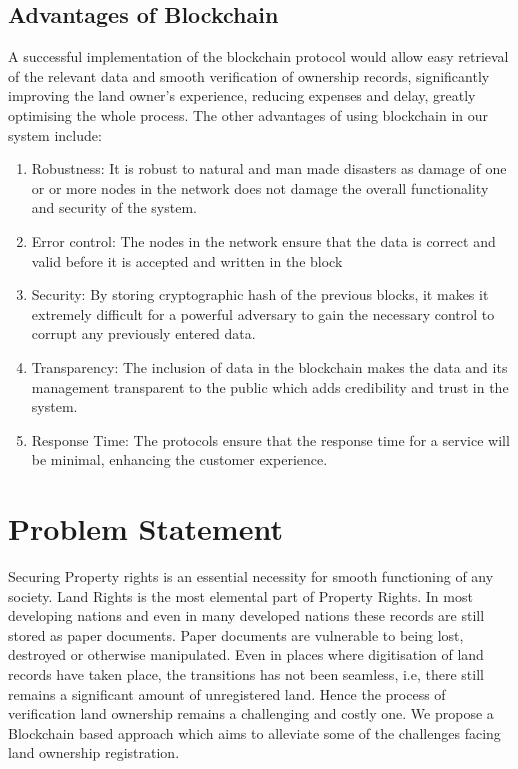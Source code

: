 \documentclass[conference]{IEEEtran}
\begin{document}
\subsection{Advantages of Blockchain}
A successful implementation of the blockchain protocol would allow easy retrieval of the relevant data and smooth verification of ownership records, significantly improving the land owner's experience, reducing expenses and delay, greatly optimising the whole process. The other advantages of using blockchain in our system include:
\begin{enumerate}
    \item Robustness: It is robust to natural and man made disasters as damage of one or or more nodes in the network does not damage the overall functionality and security of the system.
    \item Error control: The nodes in the network ensure that the data is correct and valid before it is accepted and written in the block
    \item Security: By storing cryptographic hash of the previous blocks, it makes it extremely difficult for a powerful adversary to gain the necessary control to corrupt any previously entered data.
    \item Transparency: The inclusion of data in the blockchain makes the data and its management transparent to the public which adds credibility and trust in the system.
    \item Response Time: The protocols ensure that the response time for a service will be minimal, enhancing the customer experience.
\end{enumerate}

\section{Problem Statement}
Securing Property rights is an essential necessity for smooth functioning of any society. Land Rights is the most elemental part of Property Rights. In most developing nations and even in many developed nations these records are still stored as paper documents. Paper documents are vulnerable to being lost, destroyed or otherwise manipulated. Even in places where digitisation of land records have taken place, the transitions has not been seamless, i.e, there still remains a significant amount of unregistered land. Hence the process of verification land ownership remains a challenging and costly one. We propose a Blockchain based approach which aims to alleviate some of the challenges facing land ownership registration.
\end{document}
